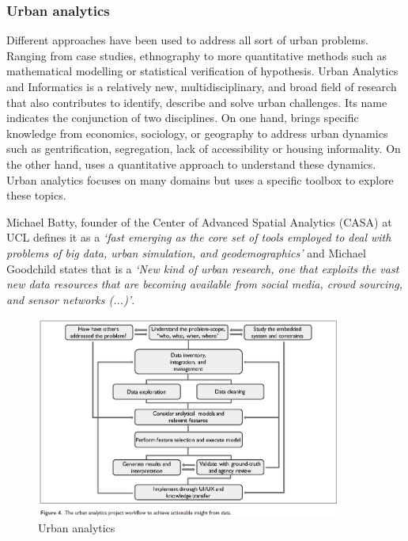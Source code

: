 \parencite{Anselin1993}





\subsubsection{Urban analytics}
Different approaches have been used to address all sort of urban problems. Ranging from case studies, ethnography to more quantitative methods such as mathematical modelling or statistical verification of hypothesis. 
Urban Analytics and Informatics is a relatively new, multidisciplinary, and broad field of research that also contributes to identify, describe and solve urban challenges. Its name indicates the conjunction of two disciplines. On one hand, brings specific knowledge from economics, sociology, or geography to address urban dynamics such as gentrification, segregation, lack of accessibility or housing informality. On the other hand, uses a quantitative approach to understand these dynamics. Urban analytics focuses on many domains but uses a specific toolbox to explore these topics. \par
Michael Batty, founder of the Center of Advanced Spatial Analytics (CASA) at UCL defines it as a \textit{`fast emerging as the core set of tools employed to deal with problems of big data, urban simulation, and geodemographics'} and Michael Goodchild states that is a \textit{`New kind of urban research, one that exploits the vast new data resources that are becoming available from social media, crowd sourcing, and sensor networks (...)'}\parencite{singletonUrbanAnalytics2018}. \par
\begin{figure}[h!]
    \centering
    \includegraphics[width=0.9\textwidth]{sections/asset/data.PNG}
    \caption{Urban analytics}
    \label{fig:urbandata}
\end{figure}


